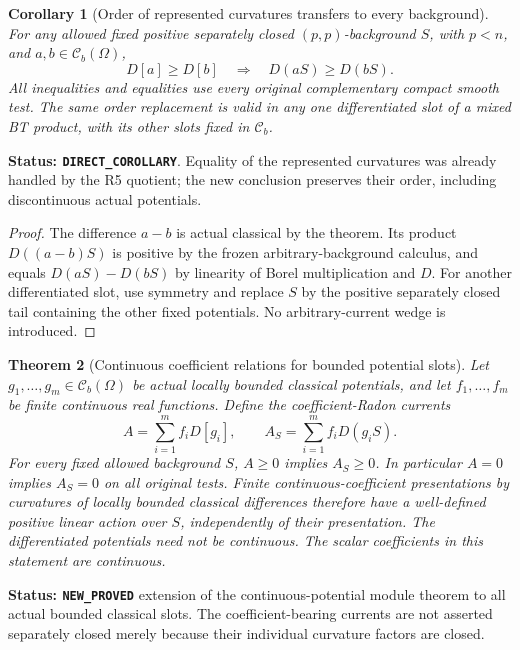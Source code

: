 \documentclass[11pt,a4paper]{article}
\numberwithin{equation}{section}
\newtheorem{theorem}{Theorem}[section]
\newtheorem{corollary}[theorem]{Corollary}
\theoremstyle{definition}
\theoremstyle{remark}
\begin{document}
\begin{corollary}[Order of represented curvatures transfers to every background]
\label{cor:r6-arbitrary-background-potential-order}
For any allowed fixed positive separately closed $(p,p)$-background
$S$, with $p<n$, and $a,b\in\mathcal C_b(\Omega)$,
\[
             D[a]\ge D[b]\quad\Longrightarrow\quad
             D(aS)\ge D(bS).
\]
All inequalities and equalities use every original complementary
compact smooth test. The same order replacement is valid in any
one differentiated slot of a mixed BT product, with its other slots
fixed in $\mathcal C_b$.
\end{corollary}

\noindent\textbf{Status: \texttt{DIRECT\_COROLLARY}}. Equality
of the represented curvatures was already handled by the R5 quotient;
the new conclusion preserves their order, including discontinuous
actual potentials.

\begin{proof}
The difference $a-b$ is actual classical by the theorem. Its product
$D((a-b)S)$ is positive by the frozen arbitrary-background calculus,
and equals $D(aS)-D(bS)$ by linearity of Borel multiplication and $D$.
For another differentiated slot, use symmetry and replace $S$ by the
positive separately closed tail containing the other fixed potentials.
No arbitrary-current wedge is introduced.
\end{proof}

\begin{theorem}[Continuous coefficient relations for bounded potential slots]
\label{thm:r6-bounded-curvature-continuous-module}
Let $g_1,\ldots,g_m\in\mathcal C_b(\Omega)$ be actual locally
bounded classical potentials, and let $f_1,\ldots,f_m$ be finite
continuous real functions. Define the coefficient-Radon currents
\[
           A=\sum_{i=1}^m f_iD[g_i],\qquad
           A_S=\sum_{i=1}^m f_iD(g_iS).
\]
For every fixed allowed background $S$, $A\ge0$ implies $A_S\ge0$.
In particular $A=0$ implies $A_S=0$ on all original tests.
Finite continuous-coefficient presentations by curvatures of locally
bounded classical differences therefore have a well-defined positive
linear action over $S$, independently of their presentation.
The differentiated potentials need not be continuous. The scalar
coefficients in this statement are continuous.
\end{theorem}

\noindent\textbf{Status: \texttt{NEW\_PROVED}} extension of the
continuous-potential module theorem to all actual bounded classical
slots. The coefficient-bearing currents are not asserted separately
closed merely because their individual curvature factors are closed.
\end{document}
